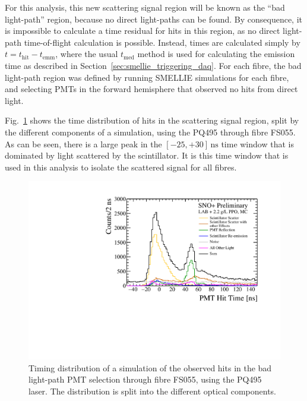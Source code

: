 For this analysis, this new scattering signal region will be known as the ``bad light-path'' region, because no direct light-paths can be found. By consequence, it is impossible to calculate a time residual for hits in this region, as no direct light-path time-of-flight calculation is possible. Instead, times are calculated simply by $t = t_{\mathrm{hit}}-t_{\mathrm{emm}}$, where the usual $t_{\mathrm{med}}$ method is used for calculating the emission time as described in Section~\ref{sec:smellie_triggering_daq}. For each fibre, the bad light-path region was defined by running SMELLIE simulations for each fibre, and selecting PMTs in the forward hemisphere that observed no hits from direct light.

Fig.~\ref{fig:smellie_bad_lightpath_region_tracked} shows the time distribution of hits in the scattering signal region, split by the different components of a simulation, using the PQ495 through fibre FS055. As can be seen, there is a large peak in the $[-25,+30]\,\si{\ns}$ time window that is dominated by light scattered by the scintillator. It is this time window that is used in this analysis to isolate the scattered signal for all fibres. 

\begin{figure}[!th]
    \centering
    \includegraphics[width=\textwidth]{5_SMELLIEAnalysis/images/bad_lightpaths_scatter_components_300712_FS055_PQ495_niceplot.pdf}
    \caption[Timing distribution of a simulation of the observed hits in the bad light-path PMT selection, split by optical components]
    {Timing distribution of a simulation of the observed hits in the bad light-path PMT selection through fibre FS055, using the PQ495 laser. The distribution is split into the different optical components.}
    \label{fig:smellie_bad_lightpath_region_tracked}
\end{figure}

